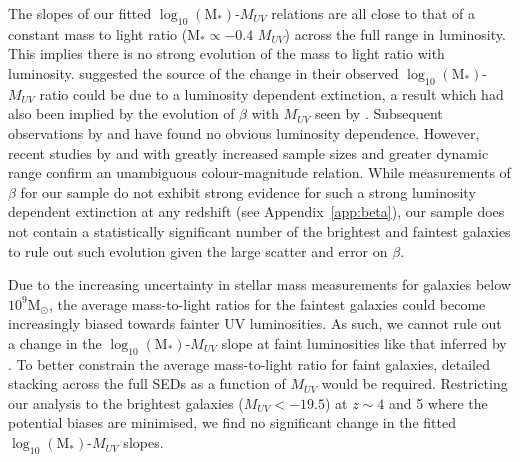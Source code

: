 The slopes of our fitted $\log_{10} (\text{M}_{*})$-$M_{UV}$ relations are all close to that of a constant mass to light ratio (M$_{*} \propto -0.4$ $M_{UV}$) across the full range in luminosity. This implies there is no strong evolution of the mass to light ratio with luminosity. \citet{2012ApJ...752...66L} suggested the source of the change in their observed $\log_{10} (\text{M}_{*})$-$M_{UV}$ ratio could be due to a luminosity dependent extinction, a result which had also been implied by the evolution of $\beta$ with $M_{UV}$ seen by \citet{2012ApJ...754...83B}. Subsequent observations by \citet{Dunlop:2011jl} and \citet{2012ApJ...756..164F} have found no obvious luminosity dependence. However, recent studies by \citet{Bouwens:2013vf} and \citep{Rogers:2014bn} with greatly increased sample sizes and greater dynamic range confirm an unambiguous colour-magnitude relation. While measurements of $\beta$ for our sample do not exhibit strong evidence for such a strong luminosity dependent extinction at any redshift (see Appendix~\ref{app:beta}), our sample does not contain a statistically significant number of the brightest and faintest galaxies to rule out such evolution given the large scatter and error on $\beta$. 

Due to the increasing uncertainty in stellar mass measurements for galaxies below $10^{9} \text{M}_{\odot}$, the average mass-to-light ratios for the faintest galaxies could become increasingly biased towards fainter UV luminosities. As such, we cannot rule out a change in the $\log_{10} (\text{M}_{*})$-$M_{UV}$ slope at faint luminosities like that inferred by \citet{2012ApJ...752...66L}. To better constrain the average mass-to-light ratio for faint galaxies, detailed stacking across the full SEDs as a function of $M_{UV}$ would be required. Restricting our analysis to the brightest galaxies ($M_{UV} < -19.5$) at $z\sim4$ and 5 where the potential biases are minimised, we find no significant change in the fitted $\log_{10} (\text{M}_{*})$-$M_{UV}$ slopes.

